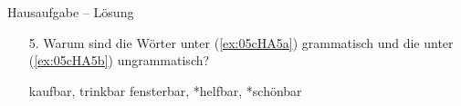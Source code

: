 \begin{frame}{Hausaufgabe -- Lösung}

\begin{enumerate}
	\item[5.] Warum sind die Wörter unter (\ref{ex:05cHA5a}) grammatisch und die unter (\ref{ex:05cHA5b}) ungrammatisch? %
	
	\begin{exe}
		\begin{xlist}
			\ex kaufbar, trinkbar
			\ex *fensterbar, *helfbar, *schönbar
		\end{xlist}
	\end{exe}
	
\pause

		\begin{itemize}
			\item[\alertred{--}] 
			\item[\alertred{--}] 
		\end{itemize}

\end{enumerate}
\end{frame}



